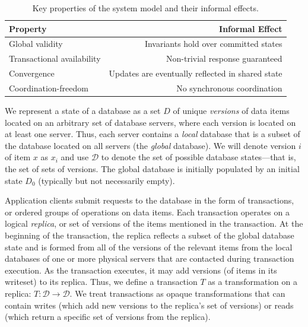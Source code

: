\begin{table}[t]
\begin{center}
\small
\begin{tabular}{|l|r|}
  \hline\textbf{Property} & \textbf{Informal Effect}  \\\hline
  Global validity & Invariants hold over committed states  \\
  Transactional availability & Non-trivial response guaranteed \\
  Convergence & Updates are eventually reflected in shared state \\
  Coordination-freedom & No synchronous coordination\\\hline
\end{tabular}
\end{center}\vspace{-.5em}
\caption{Key properties of the system model and their informal effects.}
\label{table:requirements}
\end{table}

 We represent a state of a database as a set $D$
of unique \textit{versions} of data items located on an arbitrary set
of database servers, where each version is located on at least one
server. Thus, each server contains a \textit{local} database that is a
subset of the database located on all servers (the \textit{global}
database). We will denote version $i$ of item $x$ as $x_i$ and use
${\mathcal D}$ to denote the set of possible database states---that
is, the set of sets of versions. The global database is initially
populated by an initial state $D_0$ (typically but not necessarily
empty).

 Application clients
submit requests to the database in the form of transactions, or
ordered groups of operations on data items. Each transaction operates
on a logical \textit{replica}, or set of versions of the items
mentioned in the transaction. At the beginning of the transaction, the
replica reflects a subset of the global database state and is formed
from all of the versions of the relevant items from the local
databases of one or more physical servers that are contacted during
transaction execution. As the transaction executes, it may add
versions (of items in its writeset) to its replica. Thus, we define a
transaction $T$ as a transformation on a replica: $T: {\mathcal
  D}\rightarrow {\mathcal D}$. We treat transactions as opaque
transformations that can contain writes (which add new versions to the
replica's set of versions) or reads (which return a specific set of
versions from the replica).

